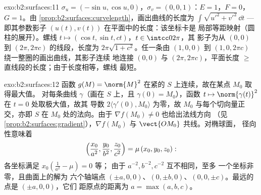 \begin{solution}{exo:b2:surfaces:11}
$\sigma_u = (-\sin u, \cos u, 0)$，$\sigma_v = (0, 0, 1)$：$E
= 1$，$F = 0$，$G = 1$。由
\cref{prop:b2:surfaces:curvelength}，画出曲线的长度为
$\int\sqrt{u'^2 + v'^2}\,\dd t$ --- 即其参数影子
$(u(t), v(t))$ 在平面中的长度：该坐标卡是
局部等距映射（圆柱的展开）。螺线
$t \mapsto (\cos t, \sin t, ct)$，$t \in \intcc0{2\pi}$，其
影子为从 $(0,0)$ 到 $(2\pi, 2\pi c)$ 的线段，长度为
$2\pi\sqrt{1 + c^2}$。任一条由 $(1,0,0)$ 到 $(1,
0, 2\pi c)$ 绕一整圈的画出曲线，其影子连续
地连接 $(0, 0)$ 与 $(2\pi, 2\pi c)$，平面长度 $\geq$
直线段的长度；由于长度相等，螺线
最短。
\end{solution}

\begin{solution}{exo:b2:surfaces:12}
函数 $g(M) = \norm{M}^2$ 在紧的
$S$ 上连续，故在某点 $M_0$ 取得最大值。
对每条曲线 $\gamma$（画在 $S$ 上，且 $\gamma(0) = M_0$），函数 $t
\mapsto \norm{\gamma(t)}^2$ 在 $t = 0$ 处取极大值，故其
导数 $2\langle\gamma'(0), M_0\rangle$ 为零，故 $M_0$
与每个切向量正交，亦即 $S$ 在
$M_0$ 处的法向。由于 $\nabla f(M_0) \neq 0$ 也给出法线方向
（见\cref{prop:b2:surfaces:gradient}），$\nabla f(M_0)$ 与
$\vect{OM_0}$ 共线。对椭球面，
径向性意味着
\[
\Bigl(\frac{x_0}{a^2}, \frac{y_0}{b^2},
\frac{z_0}{c^2}\Bigr) = \mu\,(x_0, y_0, z_0) :
\]
各坐标满足 $x_0(\frac1{a^2} - \mu) = 0$ 等；
由于 $a^{-2}, b^{-2}, c^{-2}$ 互不相同，至多
一个坐标非零，且曲面上的解为
六个轴端点 $(\pm a, 0, 0)$、$(0, \pm b, 0)$、$(0,
0, \pm c)$。最远的点是 $(\pm a, 0, 0)$，它们
距原点的距离为 $a = \max(a,b,c)$。
\end{solution}

